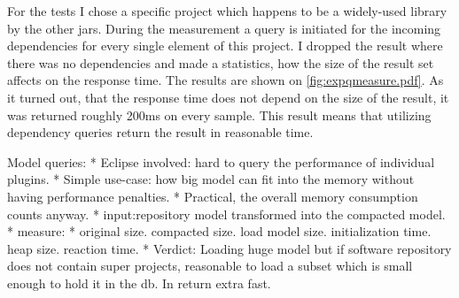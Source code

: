 For the tests I chose a specific project which happens to be a widely-used
library by the other jars. During the measurement a query is initiated for 
the incoming dependencies for every single element of this project. 
I dropped the result where there was no dependencies and made a statistics, how 
the size of the result set affects on the response time.
The results are shown on \autoref{fig:expqmeasure.pdf}.
As it turned out, that the response time does not depend on the size of the result,
it was returned roughly 200ms on every sample. This result means that utilizing 
dependency queries return the result in reasonable time. 


 
Model queries:
 * Eclipse involved: hard to query the performance of individual plugins.
 * Simple use-case: how big model can fit into the memory without having
 performance penalties.
 * Practical, the overall memory consumption counts anyway.
 * input:repository model transformed into the compacted model.
 * measure:
   * original size. compacted size. load model size. initialization time. heap
   size. reaction time.
 * Verdict: Loading huge model but if  software repository does not contain
 super projects, reasonable to load a subset which is small enough to  hold it
 in the db. In return extra fast. 
